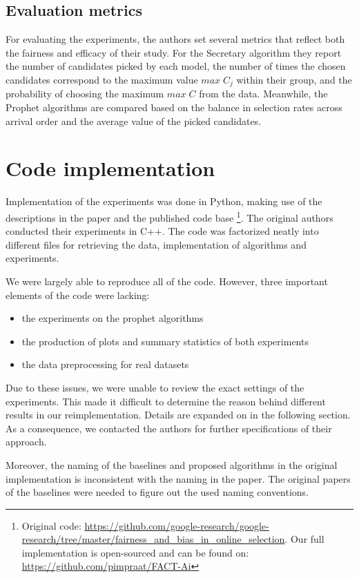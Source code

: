 \subsection{Evaluation metrics}\label{section:evluation_metrics}
For evaluating the experiments, the authors set several metrics that reflect both the fairness and efficacy of their study. For the Secretary algorithm they report the number of candidates picked by each model, the number of times the chosen candidates correspond to the maximum value $max\;C_j$ within their group, and the probability of choosing the maximum $max\;C$ from the data. Meanwhile, the Prophet algorithms are compared based on the balance in selection rates across arrival order and the average value of the picked candidates.


\section{Code implementation}
Implementation of the experiments was done in Python, making use of the descriptions in the paper and the published code base \footnote{Original code:  \url{https://github.com/google-research/google-research/tree/master/fairness_and_bias_in_online_selection}. Our full implementation is open-sourced and can be found on: \url{https://github.com/pimpraat/FACT-Ai}}. The original authors conducted their experiments in C++. The code was factorized neatly into different files for retrieving the data, implementation of algorithms and experiments.

We were largely able to reproduce all of the code. However, three important elements of the code were lacking:
\begin{itemize}
    \item the experiments on the prophet algorithms
    \item the production of plots and summary statistics of both experiments
    \item the data preprocessing for real datasets
\end{itemize}
Due to these issues, we were unable to review the exact settings of the experiments. This made it difficult to determine the reason behind different results in our reimplementation. Details are expanded on in the following section. As a consequence, we contacted the authors for further specifications of their approach.

Moreover, the naming of the baselines and proposed algorithms in the original implementation is inconsistent with the naming in the paper. The original papers of the baselines were needed to figure out the used naming conventions. 


